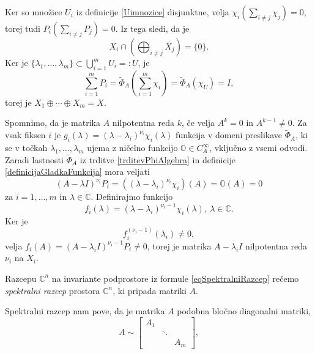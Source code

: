 \documentclass[mat1]{fmfdelo}
\newcommand{\C}{\mathbb C}
\begin{document}
\begin{dokaz}
    Ker so množice $U_i$ iz definicije \ref{Uimnozice} disjunktne, velja $\chi_i\left(\sum_{i \neq j} \chi_j\right) = 0$, torej tudi $P_i\left(\sum_{i \neq j} P_j\right) = 0$. Iz tega sledi, da je
    \begin{equation*}
        X_i \cap \left(\bigoplus_{i \neq j} X_j\right) = \{0\}.
    \end{equation*}
    Ker je $\{\lambda_1, \ldots, \lambda_m\} \subset \bigcup_{i = 1}^m U_i =: U$, je
    \begin{equation*}
        \sum_{i = 1}^m P_i = \widetilde{\Phi}_A \left(\sum_{i=1}^m \chi_i \right) = \widetilde{\Phi}_A (\chi_U) = I,
    \end{equation*}
    torej je $X_1 \oplus \cdots \oplus X_m = X$.
    
    Spomnimo, da je matrika $A$ nilpotentna reda $k$, če velja $A^k = 0$ in $A^{k-1} \neq 0$. Za vsak fiksen $i$ je $g_i(\lambda) = (\lambda - \lambda_i)^{\nu_i} \chi_i(\lambda)$ funkcija v domeni preslikave $\widetilde{\Phi}_A$, ki se v točkah $\lambda_1, \ldots, \lambda_m$ ujema z ničelno funkcijo $\mathbb{O} \in C_A^{\infty}$, vključno z vsemi odvodi. Zaradi lastnosti $\widetilde{\Phi}_A$ iz trditve \ref{trditevPhiAlgebra} in definicije \ref{definicijaGladkaFunkcija} mora veljati
    \begin{equation*}
        (A - \lambda I)^{\nu_i} P_i = \left(\left(\lambda - \lambda_i \right)^{\nu_i} \chi_i \right) (A) = \mathbb{O}(A) = 0
    \end{equation*}
    za $i = 1, \ldots, m$ in $\lambda \in \C$. Definirajmo funkcijo
    \begin{equation*}
        f_i(\lambda) = (\lambda - \lambda_i)^{\nu_i - 1} \chi_i(\lambda),\ \lambda \in \C.
    \end{equation*}
    Ker je
    \begin{equation*}
        f_i^{(\nu_i-1)} (\lambda_i) \neq 0,
    \end{equation*}
    velja $f_i(A) = (A - \lambda_i I)^{\nu_i-1} P_i \neq 0$, torej je matrika $A - \lambda_i I$ nilpotentna reda $\nu_i$ na $X_i$.
\end{dokaz}
\begin{definicija}
    Razcepu $\C^n$ na invariante podprostore iz formule \eqref{eqSpektralniRazcep} rečemo \emph{spektralni razcep} prostora $\C^n$, ki pripada matriki $A$. 
\end{definicija}
Spektralni razcep nam pove, da je matrika $A$ podobna bločno diagonalni matriki,
\begin{equation*}
    A \sim
    \begin{bmatrix}
       A_1 & & \\
       & \ddots & \\
       & & A_m 
    \end{bmatrix},
\end{equation*}
\end{document}
